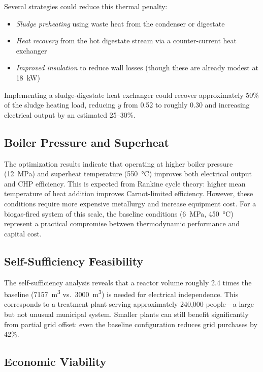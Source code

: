 \documentclass[12pt, letterpaper]{article}
\begin{document}
Several strategies could reduce this thermal penalty:
\begin{itemize}[noitemsep]
  \item \textit{Sludge preheating} using waste heat from the condenser or digestate
  \item \textit{Heat recovery} from the hot digestate stream via a counter-current heat exchanger
  \item \textit{Improved insulation} to reduce wall losses (though these are already modest at \SI{18}{\kilo\watt})
\end{itemize}

Implementing a sludge-digestate heat exchanger could recover approximately 50\% of the sludge heating load, reducing $y$ from 0.52 to roughly 0.30 and increasing electrical output by an estimated 25--30\%.

\subsection{Boiler Pressure and Superheat}

The optimization results indicate that operating at higher boiler pressure (\SI{12}{\mega\pascal}) and superheat temperature (\SI{550}{\celsius}) improves both electrical output and CHP efficiency. This is expected from Rankine cycle theory: higher mean temperature of heat addition improves Carnot-limited efficiency. However, these conditions require more expensive metallurgy and increase equipment cost. For a biogas-fired system of this scale, the baseline conditions (\SI{6}{\mega\pascal}, \SI{450}{\celsius}) represent a practical compromise between thermodynamic performance and capital cost.

\subsection{Self-Sufficiency Feasibility}

The self-sufficiency analysis reveals that a reactor volume roughly 2.4 times the baseline (\SI{7157}{\cubic\metre} vs.\ \SI{3000}{\cubic\metre}) is needed for electrical independence. This corresponds to a treatment plant serving approximately 240,000 people---a large but not unusual municipal system. Smaller plants can still benefit significantly from partial grid offset: even the baseline configuration reduces grid purchases by 42\%.

\subsection{Economic Viability}
\end{document}
